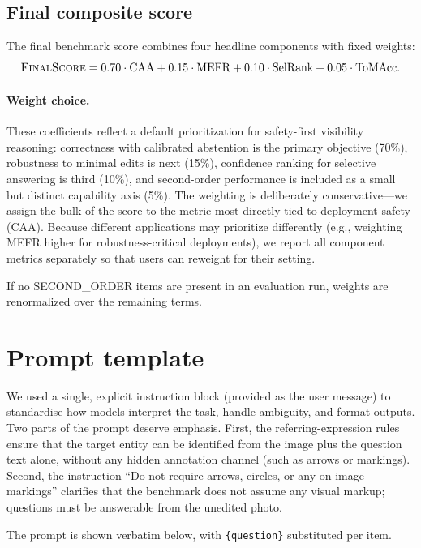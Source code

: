 \documentclass[11pt]{article}
\begin{document}
\subsection{Final composite score}

The final benchmark score combines four headline components with fixed weights:
\[
\textsc{FinalScore}=0.70\cdot \text{CAA}
+0.15\cdot \text{MEFR}
+0.10\cdot \text{SelRank}
+0.05\cdot \text{ToMAcc}.
\]

\paragraph{Weight choice.}
These coefficients reflect a default prioritization for safety-first visibility reasoning: correctness with calibrated abstention is the primary objective (70\%), robustness to minimal edits is next (15\%), confidence ranking for selective answering is third (10\%), and second-order performance is included as a small but distinct capability axis (5\%). The weighting is deliberately conservative---we assign the bulk of the score to the metric most directly tied to deployment safety (CAA). Because different applications may prioritize differently (e.g., weighting MEFR higher for robustness-critical deployments), we report all component metrics separately so that users can reweight for their setting.

If no SECOND\_ORDER items are present in an evaluation run, weights are renormalized over the remaining terms.

\section{Prompt template}
\label{sec:prompt}

We used a single, explicit instruction block (provided as the user message) to standardise how models interpret the task, handle ambiguity, and format outputs. Two parts of the prompt deserve emphasis. First, the referring-expression rules ensure that the target entity can be identified from the image plus the question text alone, without any hidden annotation channel (such as arrows or markings). Second, the instruction ``Do not require arrows, circles, or any on-image markings'' clarifies that the benchmark does not assume any visual markup; questions must be answerable from the unedited photo.

The prompt is shown verbatim below, with \texttt{\{question\}} substituted per item.
\end{document}
